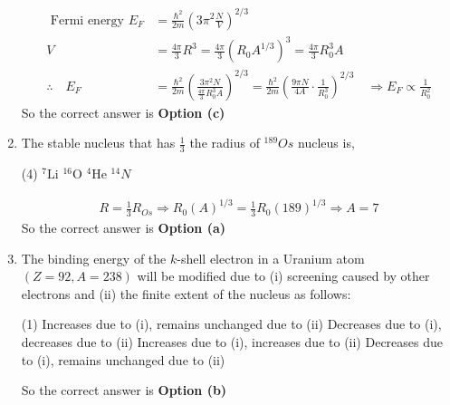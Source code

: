 \begin{enumerate}
\begin{answer}
	\begin{align*}
	\text { Fermi energy } E_F&=\frac{\hbar^2}{2 m}\left(3 \pi^2 \frac{N}{V}\right)^{2 / 3}\\
	V&=\frac{4 \pi}{3} R^3=\frac{4 \pi}{3}\left(R_0 A^{1 / 3}\right)^3=\frac{4 \pi}{3} R_0^3 A \\
	\therefore\quad E_F&=\frac{\hbar^2}{2 m}\left(\frac{3 \pi^2 N}{\frac{4 \pi}{3} R_0^3 A}\right)^{2 / 3}=\frac{\hbar^2}{2 m}\left(\frac{9 \pi N}{4 A} \cdot \frac{1}{R_0^3}\right)^{2 / 3} \quad \Rightarrow E_F \propto \frac{1}{R_0^2}
	\end{align*}
	So the correct answer is \textbf{Option (c)}
\end{answer}
\item  The stable nucleus that has $\frac{1}{3}$ the radius of ${ }^{189} O s$ nucleus is,
\begin{tasks}(4)
	\task[\textbf{a.}]${ }^7 \mathrm{Li}$
	\task[\textbf{b.}] ${ }^{16} \mathrm{O}$
	\task[\textbf{c.}]${ }^4 \mathrm{He}$
	\task[\textbf{d.}] ${ }^{14} N$
\end{tasks}
\begin{answer}
	\begin{align*}
	R=\frac{1}{3} R_{O s} \Rightarrow R_0(A)^{1 / 3}=\frac{1}{3} R_0(189)^{1 / 3} \Rightarrow A=7
	\end{align*}
	So the correct answer is \textbf{Option (a)}
\end{answer}
\item  The binding energy of the $k$-shell electron in a Uranium atom $(Z=92, A=238)$ will be modified due to (i) screening caused by other electrons and (ii) the finite extent of the nucleus as follows:
\begin{tasks}(1)
	\task[\textbf{a.}]Increases due to (i), remains unchanged due to (ii)
	\task[\textbf{b.}]Decreases due to (i), decreases due to (ii)
	\task[\textbf{c.}]Increases due to (i), increases due to (ii)
	\task[\textbf{d.}] Decreases due to (i), remains unchanged due to (ii)
\end{tasks}
\begin{answer}
	So the correct answer is \textbf{Option (b)}
\end{answer}
\end{enumerate}